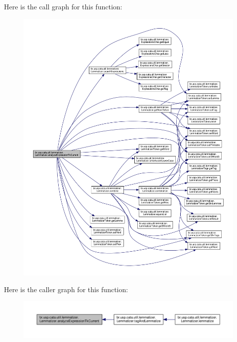 Here is the call graph for this function\+:\nopagebreak
\begin{figure}[H]
\begin{center}
\leavevmode
\includegraphics[width=350pt]{classbr_1_1usp_1_1cata_1_1util_1_1lemmatizer_1_1_lemmatizer_a9619a90003cd6c2d1425d8ea45ccde5b_cgraph}
\end{center}
\end{figure}




Here is the caller graph for this function\+:\nopagebreak
\begin{figure}[H]
\begin{center}
\leavevmode
\includegraphics[width=350pt]{classbr_1_1usp_1_1cata_1_1util_1_1lemmatizer_1_1_lemmatizer_a9619a90003cd6c2d1425d8ea45ccde5b_icgraph}
\end{center}
\end{figure}


